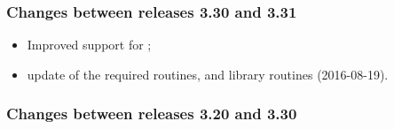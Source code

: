\documentclass[12pt,twoside]{article}
\begin{document}
{\subsubsection{Changes between releases 3.30 and 3.31}
\begin{itemize} %
	\item Improved support for ;
	\item update of the required
    routines, and  library
    routines (2016-08-19).
\end{itemize} %

\subsubsection{Changes between releases 3.20 and 3.30}
\begin{itemize} %


\end{itemize}}
\end{document}
